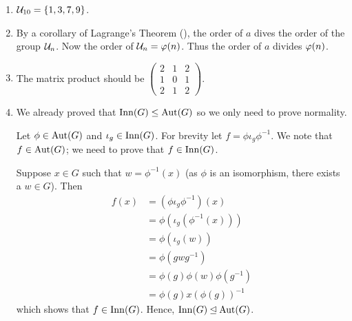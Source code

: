 \begin{enumerate}
    \item $\mathcal{U}_{10} = \{1, 3, 7, 9\}$.

    \item By a corollary of Lagrange's Theorem (), the order of $a$ dives the order of the group $\mathcal{U}_{n}$. Now the order of $\mathcal{U}_{n} = \varphi(n)$. Thus the order of $a$ divides $\varphi(n)$.

    \item The matrix product should be $\begin{pmatrix}2&1&2\\1&0&1\\2&1&2\end{pmatrix}$.

    \item We already proved that $\mathrm{Inn}(G) \leq \mathrm{Aut}(G)$ so we only need to prove normality.

    Let $\phi \in \mathrm{Aut}(G)$ and $\iota_g \in \mathrm{Inn}(G)$. For brevity let $f = \phi\iota_g\phi^{-1}$. We note that $f \in \mathrm{Aut}(G)$; we need to prove that $f \in \mathrm{Inn}(G)$.

    Suppose $x \in G$ such that $w = \phi^{-1}(x)$ (as $\phi$ is an isomorphism, there exists a $w \in G$). Then
    \begin{align*}
        f(x) &= \left(\phi\iota_g\phi^{-1}\right)(x)\\
        &= \phi(\iota_g(\phi^{-1}(x)))\\
        &= \phi(\iota_g(w))\\
        &= \phi(gwg^{-1})\\
        &= \phi(g)\phi(w)\phi(g^{-1})\\
        &= \phi(g)x\left(\phi(g)\right)^{-1}
    \end{align*}
    which shows that $f \in \mathrm{Inn}(G)$. Hence, $\mathrm{Inn}(G) \unlhd \mathrm{Aut}(G)$.
\end{enumerate}

